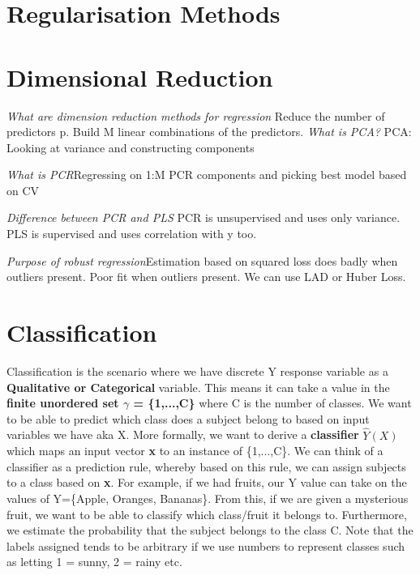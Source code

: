 \documentclass[11pt, oneside]{article}
\theoremstyle{definition}
\begin{document}
\section{Regularisation Methods}
\section{Dimensional Reduction}
\textit{What are dimension reduction methods for regression} Reduce the number of predictors p. Build M linear combinations of the predictors.
\textit{What is PCA?} PCA: Looking at variance and constructing components

\textit{What is PCR}Regressing on 1:M PCR components and picking best model based on CV

\textit{Difference between PCR and PLS} PCR is unsupervised and uses only variance. PLS is supervised and uses correlation with y too.

\textit{Purpose of robust regression}Estimation based on squared loss does badly when outliers present. Poor fit when outliers present. We can use LAD or Huber Loss.
\newpage
\section{Classification}
Classification is the scenario where we have discrete Y response variable as a \textbf{Qualitative or Categorical} variable. This means it can take a value in the \textbf{finite unordered set $\gamma$ = \{1,...,C\}} where C is the number of classes. We want to be able to predict which class does a subject belong to based on input variables we have aka X. More formally, we want to derive a \textbf{classifier} $\hat{Y}(X)$ which maps an input vector \textbf{x} to an instance of \{1,...,C\}. We can think of a classifier as a prediction rule, whereby based on this rule, we can assign subjects to a class based on \textbf{x}. For example, if we had fruits, our Y value can take on the values of Y=\{Apple, Oranges, Bananas\}. From this, if we are given a mysterious fruit, we want to be able to classify which class/fruit it belongs to. Furthermore, we estimate the probability that the subject belongs to the class C. Note that the labels assigned tends to be arbitrary if we use numbers to represent classes such as letting 1 = sunny, 2 = rainy etc.
\end{document}
